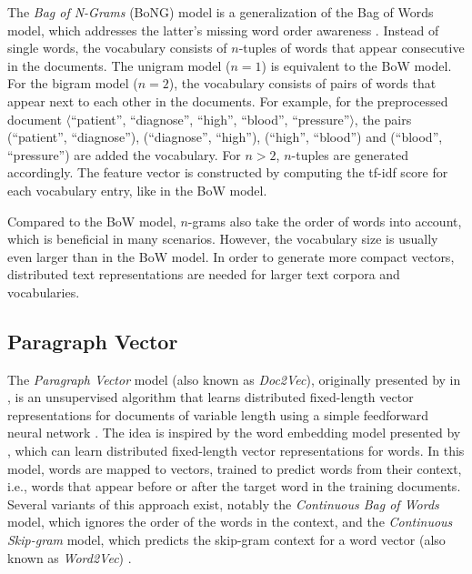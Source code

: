 The \textit{Bag of N-Grams} (BoNG) model is a generalization of the Bag of Words model, which addresses the latter’s missing word order awareness \cite{brown1992class}.
Instead of single words, the vocabulary consists of $n$-tuples of words that appear consecutive in the documents.
The unigram model ($n=1$) is equivalent to the BoW model.
For the bigram model ($n=2$), the vocabulary consists of pairs of words that appear next to each other in the documents.
For example, for the preprocessed document $\langle$\enquote{patient},  \enquote{diagnose},  \enquote{high},  \enquote{blood},  \enquote{pressure}$\rangle$, the pairs (\enquote{patient},  \enquote{diagnose}), (\enquote{diagnose},  \enquote{high}), (\enquote{high},  \enquote{blood}) and (\enquote{blood},  \enquote{pressure}) are added the vocabulary.
For $n>2$, $n$-tuples are generated accordingly.
The feature vector is constructed by computing the tf-idf score for each vocabulary entry, like in the BoW model.

Compared to the BoW model, $n$-grams also take the order of words into account, which is beneficial in many scenarios.
However, the vocabulary size is usually even larger than in the BoW model.
In order to generate more compact vectors, distributed text representations are needed for larger text corpora and vocabularies.

\subsection{Paragraph Vector}

The \textit{Paragraph Vector} model (also known as \textit{Doc2Vec}), originally presented by \citeauthor{DBLP:conf/icml/LeM14} in \citeyear{DBLP:conf/icml/LeM14}, is an unsupervised algorithm that learns distributed fixed-length vector representations for documents of variable length using a simple feedforward neural network \cite{DBLP:conf/icml/LeM14}.
The idea is inspired by the word embedding model presented by \citeauthor{DBLP:journals/jmlr/BengioDVJ03} \cite{DBLP:journals/jmlr/BengioDVJ03}, which can learn distributed fixed-length vector representations for words.
In this model, words are mapped to vectors, trained to predict words from their context, i.e., words that appear before or after the target word in the training documents.
Several variants of this approach exist, notably the \textit{Continuous Bag of Words} model, which ignores the order of the words in the context, and the \textit{Continuous Skip-gram} model, which predicts the skip-gram context for a word vector (also known as \textit{Word2Vec}) \cite{DBLP:journals/corr/abs-1301-3781}.

